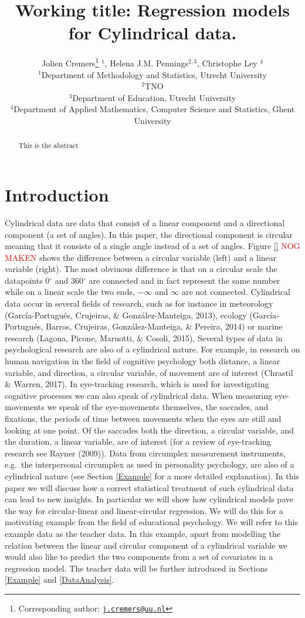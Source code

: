 \documentclass[11pt,]{article}
\title{Working title: Regression models for Cylindrical data.}
\author{Jolien Cremers\footnote{Corresponding author:
  \href{mailto:j.cremers@uu.nl}{\nolinkurl{j.cremers@uu.nl}}} \(^1\),
Helena J.M. Pennings\(^{2,3}\), Christophe Ley \(^{4}\)\\
\(^1\)Department of Methodology and Statistics, Utrecht University\\
\(^2\)TNO\\
\(^3\)Department of Education, Utrecht University\\
\(^4\)Department of Applied Mathematics, Computer Science and
Statistics, Ghent University}
\date{}
\begin{document}
\maketitle
\begin{abstract}
This is the abstract
\end{abstract}

\section{Introduction}\label{Introduction}

Cylindrical data are data that consist of a linear component and a
directional component (a set of angles). In this paper, the directional
component is circular meaning that it consists of a single angle instead
of a set of angles. Figure \ref{} \textcolor{red}{NOG MAKEN} shows the
difference between a circular variable (left) and a linear variable
(right). The most obviuous difference is that on a circular scale the
datapoints 0\(^\circ\) and 360\(^\circ\) are connected and in fact
represent the same number while on a linear scale the two ends,
\(-\infty\) and \(\infty\) are not connected. Cylindrical data occur in
several fields of research, such as for instance in meteorology
(García-Portugués, Crujeiras, \& González-Manteiga, 2013), ecology
(García-Portugués, Barros, Crujeiras, González-Manteiga, \& Pereira,
2014) or marine research (Lagona, Picone, Maruotti, \& Cosoli, 2015).
Several types of data in psychological research are also of a
cylindrical nature. For example, in research on human navigation in the
field of cognitive psychology both distance, a linear variable, and
direction, a circular variable, of movement are of interest (Chrastil \&
Warren, 2017). In eye-tracking research, which is used for investigating
cognitive processes we can also speak of cylindrical data. When
measuring eye-movements we speak of the eye-movements themselves, the
saccades, and fixations, the periods of time between movements when the
eyes are still and looking at one point. Of the saccades both the
direction, a circular variable, and the duration, a linear variable, are
of interest (for a review of eye-tracking research see Rayner (2009)).
Data from circumplex measurement instruments, e.g.~the interpersonal
circumplex as used in personality psychology, are also of a cylindrical
nature (see Section \ref{Example} for a more detailed explanation). In
this paper we will discuss how a correct statistical treatment of such
cylindrical data can lead to new insights. In particular we will show
how cylindrical models pave the way for circular-linear and
linear-circular regression. We will do this for a motivating example
from the field of educational psychology. We will refer to this example
data as the teacher data. In this example, apart from modelling the
relation between the linear and circular component of a cylindrical
variable we would also like to predict the two components from a set of
covariates in a regression model. The teacher data will be further
introduced in Sections \ref{Example} and \ref{DataAnalysis}.
\end{document}
